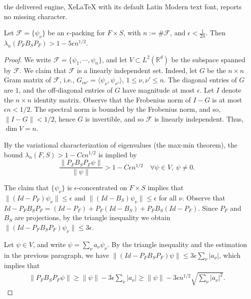 \documentclass[10pt,a4paper]{amsart}
\def\R{\mathbb{R}}
\newcommand{\cF}{\mathcal F}
\begin{document}
the delivered engine, XeLaTeX with its default Latin Modern text font, reports no missing character.
\begin{lemma}\label{packing_spectral:lem}
Let $\cF = \{\psi_\nu\}$ be an $\epsilon$-packing  for $F \times S$, with $n := \#\cF$, and $\epsilon < \frac{1}{2n}$. Then $\lambda_{n}(P_F B_S P_F) > 1 - 5 \epsilon n^{1/2}$.
\end{lemma}

\begin{proof}
We write $\cF = \{\psi_1,\cdots,\psi_n\}$, and let $V \subset L^2(\R^d)$ be the subspace spanned by $\cF$. We claim that $\cF$ is a linearly independent set. Indeed, let $G$ be the $n \times n$ Gram matrix of $\cF$, i.e., $G_{\nu \nu'} = \langle \psi_\nu,\psi_{\nu'}\rangle$, $1 \leq \nu,\nu' \leq n$. The diagonal entries of $G$ are $1$, and the off-diagonal entries of $G$ have magnitude at most $\epsilon$. Let $I$ denote the $n \times n$ identity matrix. Observe that the Frobenius norm of $I - G$ is at most $\epsilon n < 1/2$. The spectral norm is bounded by the Frobenius norm, and so, $\| I - G \| < 1/2$, hence $G$ is invertible, and so $\cF$ is linearly independent. Thus, $\dim V = n$. 

By the variational characterization of eigenvalues (the max-min theorem), the bound $\lambda_n(F,S) > 1 - C \epsilon n^{1/2}$ is implied by
\[
\frac{\|P_F B_S P_F \psi\|}{\| \psi \|} > 1- C \epsilon n^{1/2} \quad \forall \psi \in V,  ~ \psi \neq 0.
\]

The claim that $\{\psi_\nu\}$ is $\epsilon$-concentrated on $F \times S$ implies that $\|(Id - P_F) \psi_\nu \| \leq \epsilon$ and $\|(Id - B_S) \psi_\nu \| \leq \epsilon$ for all $\nu$. Observe that $Id - P_F B_S P_F = (Id - P_F) + P_F(Id - B_S) + P_F B_S (Id - P_F)$. Since $P_F$ and $B_S$ are projections, by the triangle inequality we obtain $\|(Id - P_F B_S P_F) \psi_\nu \| \leq 3 \epsilon$.

Let $\psi \in V$, and write $\psi = \sum_\nu a_\nu \psi_\nu$. By the triangle inequality and the estimation in the previous paragraph, we have $\| (Id - P_FB_SP_F) \psi \| \leq 3 \epsilon \sum_{\nu} |a_\nu|$, which implies that
\begin{align*}
\| P_F B_S P_F \psi \| \geq \| \psi \| - 3 \epsilon \sum_\nu |a_\nu| \geq \| \psi\| - 3 \epsilon n^{1/2} 
 \sqrt{\sum_\nu |a_\nu|^2}.
\end{align*}
 

\end{proof}
\end{document}
